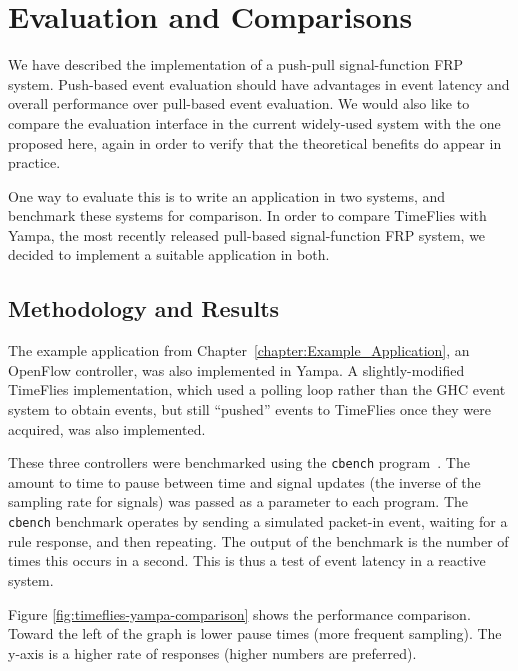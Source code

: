 \chapter{Evaluation and Comparisons}
\label{chapter:Evaluation_and_Comparisons}

We have described the implementation of a push-pull signal-function FRP system.
Push-based event evaluation should have advantages in event latency and overall
performance over pull-based event evaluation. We would also like to compare
the evaluation interface in the current widely-used system with the one proposed
here, again in order to verify that the theoretical benefits do appear in
practice.

One way to evaluate this is to write an application in two systems, and benchmark
these systems for comparison. In order to compare TimeFlies with Yampa, the most
recently released pull-based signal-function FRP system, we decided to implement
a suitable application in both.

\section{Methodology and Results}
\label{section:Evaluation_and_Comparisons-Methodology_and_Results}

The example application from Chapter~\ref{chapter:Example_Application}, an
OpenFlow controller, was also implemented in Yampa. A slightly-modified
TimeFlies implementation, which used a polling loop rather than the GHC event
system to obtain events, but still ``pushed'' events to TimeFlies once they were
acquired, was also implemented.

These three controllers were benchmarked using the {\tt cbench}
program~\cite{cbench}. The amount to time to pause between time and signal
updates (the inverse of the sampling rate for signals) was passed as a parameter
to each program. The {\tt cbench} benchmark operates by sending a simulated
packet-in event, waiting for a rule response, and then repeating. The output of
the benchmark is the number of times this occurs in a second. This is thus a
test of event latency in a reactive system.

Figure \ref{fig:timeflies-yampa-comparison} shows the performance comparison.
Toward the left of the graph is lower pause times (more frequent sampling). The
y-axis is a higher rate of responses (higher numbers are preferred). 

